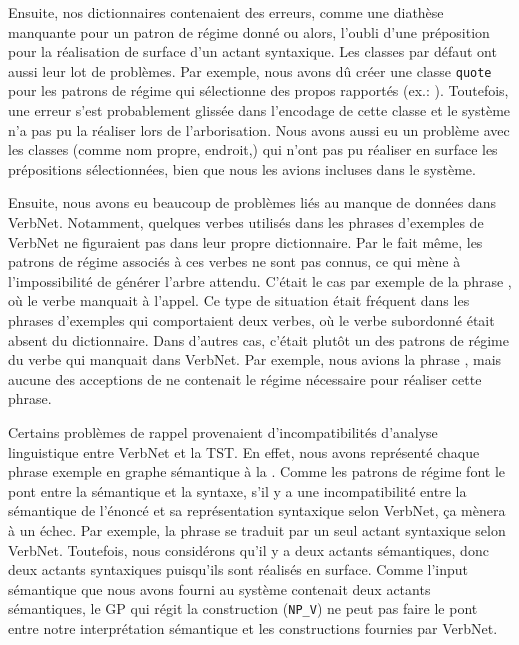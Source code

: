 Ensuite, nos dictionnaires contenaient des erreurs, comme une diathèse manquante pour un patron de régime donné ou alors, l'oubli d'une préposition pour la réalisation de surface d'un actant syntaxique. Les classes par défaut ont aussi leur lot de problèmes. Par exemple, nous avons dû créer une classe \texttt{quote} pour les patrons de régime qui sélectionne des propos rapportés (ex.: ). Toutefois, une erreur s'est probablement glissée dans l'encodage de cette classe et le système n'a pas pu la réaliser lors de l'arborisation. Nous avons aussi eu un problème avec les classes (comme nom propre, endroit,) qui n'ont pas pu réaliser en surface les prépositions sélectionnées, bien que nous les avions incluses dans le système.

Ensuite, nous avons eu beaucoup de problèmes liés au manque de données dans VerbNet. Notamment, quelques verbes utilisés dans les phrases d'exemples de VerbNet ne figuraient pas dans leur propre dictionnaire. Par le fait même, les patrons de régime associés à ces verbes ne sont pas connus, ce qui mène à l'impossibilité de générer l'arbre attendu. C'était le cas par exemple de la phrase , où le verbe  manquait à l'appel. Ce type de situation était fréquent dans les phrases d'exemples qui comportaient deux verbes, où le verbe subordonné était absent du dictionnaire. Dans d'autres cas, c'était plutôt un des patrons de régime du verbe qui manquait dans VerbNet. Par exemple, nous avions la phrase , mais aucune des acceptions de  ne contenait le régime nécessaire pour réaliser cette phrase.

Certains problèmes de rappel provenaient d'incompatibilités d'analyse linguistique entre VerbNet et la \ac{TST}. En effet, nous avons représenté chaque phrase exemple en graphe sémantique à la \cite{mel2012semantics}. Comme les patrons de régime font le pont entre la sémantique et la syntaxe, s'il y a une incompatibilité entre la sémantique de l'énoncé et sa représentation syntaxique selon VerbNet, ça mènera à un échec. Par exemple, la phrase  se traduit par un seul actant syntaxique selon VerbNet. Toutefois, nous considérons qu'il y a deux actants sémantiques, donc deux actants syntaxiques puisqu'ils sont réalisés en surface. Comme l'input sémantique que nous avons fourni au système contenait deux actants sémantiques, le \ac{GP} qui régit la construction (\texttt{NP\_V}) ne peut pas faire le pont entre notre interprétation sémantique et les constructions fournies par VerbNet. 

